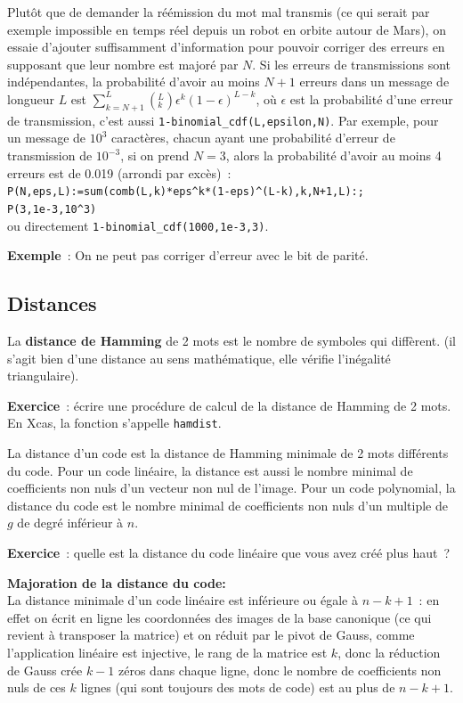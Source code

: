 \documentclass[a4paper,11pt]{book}
\begin{document}
\begin{giacjshere}
Plut\^ot que de demander la r\'e\'emission du mot mal transmis
(ce qui serait par exemple impossible en temps réel 
depuis un robot en orbite autour de Mars),
on essaie d'ajouter suffisamment d'information pour 
pouvoir corriger des erreurs en supposant
que leur nombre est major\'e par $N$. 
Si les erreurs de
transmissions sont ind\'ependantes, la probabilit\'e d'avoir
au moins $N+1$ erreurs dans un message de longueur $L$
est $\sum_{k=N+1}^L \left( ^L_{k} \right) \epsilon^{k} (1-\epsilon)^{L-k}$, 
o\`u $\epsilon$ est la probabilit\'e d'une erreur
de transmission, c'est aussi \verb|1-binomial_cdf(L,epsilon,N)|. 
Par exemple, pour un message de $10^3$ caract\`eres,
chacun ayant une probabilit\'e d'erreur de transmission de $10^{-3}$,
si on prend $N=3$, alors la probabilit\'e d'avoir au moins 4 erreurs
est de 0.019 (arrondi par exc\`es)~:\\
\verb|P(N,eps,L):=sum(comb(L,k)*eps^k*(1-eps)^(L-k),k,N+1,L):;|\\
\verb|P(3,1e-3,10^3)|\\
ou directement \verb|1-binomial_cdf(1000,1e-3,3)|.

{\bf Exemple}~: On ne peut pas corriger d'erreur avec le bit de parité.

\subsection{Distances} 
La {\bf distance de Hamming} 
de 2 mots est le nombre de symboles qui diffèrent.
(il s'agit bien d'une distance au sens mathématique, 
elle v\'erifie l'in\'egalit\'e triangulaire). 

{\bf Exercice}~: écrire une procédure de calcul de la distance de Hamming
de 2 mots. En Xcas, la fonction s'appelle {\tt hamdist}.

La distance d'un code est la distance de Hamming minimale
de 2 mots diff\'erents du code.
Pour un code lin\'eaire, la distance est aussi le nombre minimal
de coefficients non nuls d'un vecteur non nul de l'image.
Pour un code polynomial, la distance du code
est le nombre minimal de coefficients non nuls d'un multiple
de $g$ de degr\'e inf\'erieur \`a $n$.

{\bf Exercice}~: quelle est la distance du code linéaire que
vous avez créé plus haut~?

{\bf Majoration de la distance du code:}\\
La distance minimale d'un code lin\'eaire est inf\'erieure ou 
\'egale \`a $n-k+1$~: en effet on écrit en ligne les coordonnées
des images de la base canonique (ce qui revient \`a transposer la
matrice) et on réduit par le pivot de Gauss,
comme l'application linéaire est injective, le rang de la matrice
est $k$, donc la réduction de Gauss crée $k-1$
zéros dans chaque ligne, donc le nombre de coefficients non nuls
de ces $k$ lignes (qui sont toujours des mots de code) est 
au plus de $n-k+1$.


\end{giacjshere}
\end{document}

